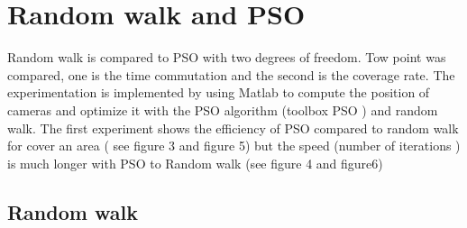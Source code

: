\graphicspath{ {./content/simu/figure/} }

\section{Random walk and PSO}\label{sec:3}

Random walk is compared to PSO with two degrees of freedom. Tow point was compared, one is the time commutation and the second is the coverage rate.
The experimentation is implemented by using Matlab to compute the position of cameras and optimize it with the PSO algorithm (toolbox PSO \cite{matlab,vrep}) and random walk.
The first experiment shows the efficiency of PSO compared to random walk for cover an area ( see figure 3 and figure 5) but the speed (number of iterations ) is much longer with PSO to Random walk (see figure 4  and figure6)   

\subsection{Random walk }\label{subsec:31}

